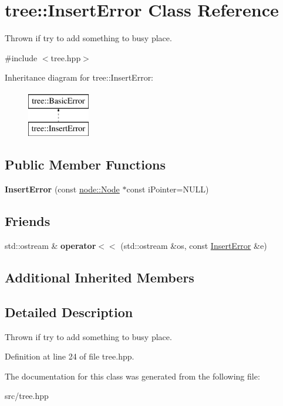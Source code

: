 \hypertarget{classtree_1_1InsertError}{\section{tree\-:\-:Insert\-Error Class Reference}
\label{classtree_1_1InsertError}
}


Thrown if try to add something to busy place.  




{\ttfamily \#include $<$tree.\-hpp$>$}

Inheritance diagram for tree\-:\-:Insert\-Error\-:\begin{figure}[H]
\begin{center}
\leavevmode
\includegraphics[height=2.000000cm]{classtree_1_1InsertError}
\end{center}
\end{figure}
\subsection*{Public Member Functions}
\begin{DoxyCompactItemize}
\item 
\hypertarget{classtree_1_1InsertError_a67b549c6063a756f96721c03ca51a6e3}{{\bfseries Insert\-Error} (const \hyperlink{classnode_1_1Node}{node\-::\-Node} $\ast$const i\-Pointer=N\-U\-L\-L)}\label{classtree_1_1InsertError_a67b549c6063a756f96721c03ca51a6e3}

\end{DoxyCompactItemize}
\subsection*{Friends}
\begin{DoxyCompactItemize}
\item 
\hypertarget{classtree_1_1InsertError_a85bf7765cbb99dba68bd7ca692ded69e}{std\-::ostream \& {\bfseries operator$<$$<$} (std\-::ostream \&os, const \hyperlink{classtree_1_1InsertError}{Insert\-Error} \&e)}\label{classtree_1_1InsertError_a85bf7765cbb99dba68bd7ca692ded69e}

\end{DoxyCompactItemize}
\subsection*{Additional Inherited Members}


\subsection{Detailed Description}
Thrown if try to add something to busy place. 

Definition at line 24 of file tree.\-hpp.



The documentation for this class was generated from the following file\-:\begin{DoxyCompactItemize}
\item 
src/tree.\-hpp\end{DoxyCompactItemize}
